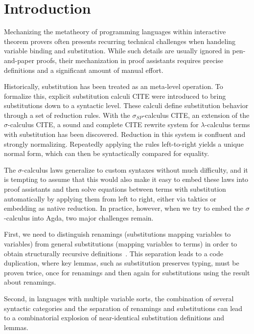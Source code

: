 \documentclass[screen,nonacm]{acmart}
\begin{document}
\maketitle

\section{Introduction}\label{sec:introduction}

Mechanizing the metatheory of programming languages within interactive theorem
provers often presents recurring technical challenges when handeling variable
binding and substitution. While such details are usually ignored in
pen-and-paper proofs, their mechanization in proof assistants requires precise
definitions and a significant amount of manual effort.

Historically, substitution has been treated as an meta-level operation. To
formalize this, explicit substitution calculi CITE were introduced to bring
substitutions down to a syntactic level. These calculi define substitution
behavior through a set of reduction rules. With the $σ_{SP}$-calculus CITE, an
extension of the $σ$-calculus CITE, a sound and complete CITE rewrite system
for $λ$-calculus terms with substitution has been discovered. Reduction in this
system is confluent and strongly normalizing. Repeatedly applying the rules
left-to-right yields a unique normal form, which can then be syntactically
compared for equality.

The $σ$-calculus laws generalize to custom syntaxes without much difficulty,
and it is tempting to assume that this would also make it easy to embed these
laws into proof assistants and then solve equations between terms with
substitution automatically by applying them from left to right, either via
taktics or embedding as native reduction. In practice, however, when we try to
embed the $\sigma$-calculus into Agda, two major challenges remain.

First, we need to distinguish renamings (substitutions mapping variables to
variables) from general substitutions (mapping variables to terms) in order to
obtain structurally recursive definitions~\cite{CITE}. This separation leads to
a code duplication, where key lemmas, such as substitution preserves typing,
must be proven twice, once for renamings and then again for substitutions using
the result about renamings.

Second, in languages with multiple variable sorts, the combination of several
syntactic categories and the separation of renamings and substitutions can lead
to a combinatorial explosion of near-identical substitution definitions and
lemmas.
\end{document}
